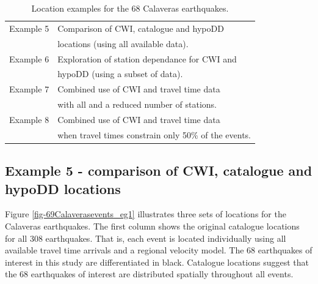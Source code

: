\documentclass[extra, onecolumn, doublespacing]{gji}
\begin{document}
\begin{table}
\caption{Location examples for the 68 Calaveras earthquakes.}
\label{tab:examples}
\begin{tabular}{ll}
\hline
Example 5 & Comparison of CWI, catalogue and hypoDD \\
 & locations (using all available data). \\
Example 6 & Exploration of station dependance for CWI and \\
 & hypoDD (using a subset of data). \\
Example 7 & Combined use of CWI and travel time data \\
& with all and a reduced number of stations. \\
Example 8 & Combined use of CWI and travel time data \\
 & when travel times constrain only 50\% of the events. \\
 \hline
\end{tabular}
\end{table}



\subsection{Example 5 - comparison of CWI, catalogue and hypoDD locations}

Figure \ref{fig-69Calaverasevents_eg1} illustrates three sets of
locations for the Calaveras earthquakes. The first column shows the
original catalogue locations for all 308 earthquakes. That is, each event
is located individually using all available travel time arrivals and
a regional velocity model. The 68 earthquakes of interest in this
study are differentiated in black. Catalogue locations suggest that
the 68 earthquakes of interest are distributed spatially throughout
all events.

\end{document}
